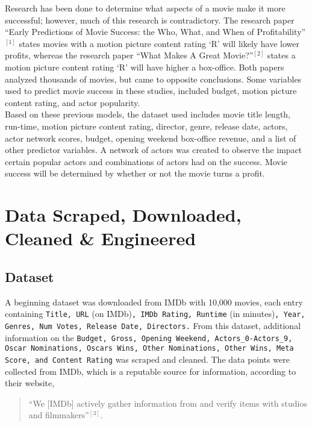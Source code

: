 \documentclass[11pt]{article}
\begin{document}
Research has been done to determine what aspects of a movie make it more
successful; however, much of this research is contradictory. The
research paper ``Early Predictions of Movie Success: the Who, What, and
When of Profitability''$^{[1]}$ states movies with a motion picture content
rating `R' will likely have lower profits, whereas the research paper
``What Makes A Great Movie?''$^{[2]}$ states a motion picture content rating `R'
will have higher a box-office. Both papers analyzed thousands of movies,
but came to opposite conclusions. Some variables used to predict movie
success in these studies, included budget, motion picture content
rating, and actor popularity.\\
Based on these previous models, the dataset used includes movie
title length, run-time, motion picture content rating, director, genre,
release date, actors, actor network scores, budget, opening weekend box-office revenue, and a list of other predictor variables. A network of actors was created to observe the impact certain popular actors and combinations of actors had on the success. Movie success will be
determined by whether or not the movie turns a profit.

\hypertarget{data-scraped-downloaded-cleaned-engineered}{%
	\section{Data Scraped, Downloaded, Cleaned \&
		Engineered}\label{data-scraped-downloaded-cleaned-engineered}}

\hypertarget{beginning-dataset}{%
	\subsection{Dataset}\label{beginning-dataset}}

A beginning dataset was downloaded from IMDb with 10,000 movies, each
entry containing \texttt{Title, URL} (on IMDb)\texttt{, IMDb Rating, Runtime} (in minutes)\texttt{, Year,
Genres, Num Votes, Release Date, Directors.} From this dataset,
additional information on the \texttt{Budget, Gross, Opening
Weekend, Actors\_0-Actors\_9, Oscar Nominations, Oscars Wins, Other Nominations, Other Wins, Meta Score, and Content Rating} was
scraped and cleaned. The data points were collected from IMDb, which
is a reputable source for information, according to their website,

\begin{quote}
	``We [IMDb] actively gather information from and verify items with
	studios and filmmakers''$^{[3]}$.
\end{quote}
\end{document}

